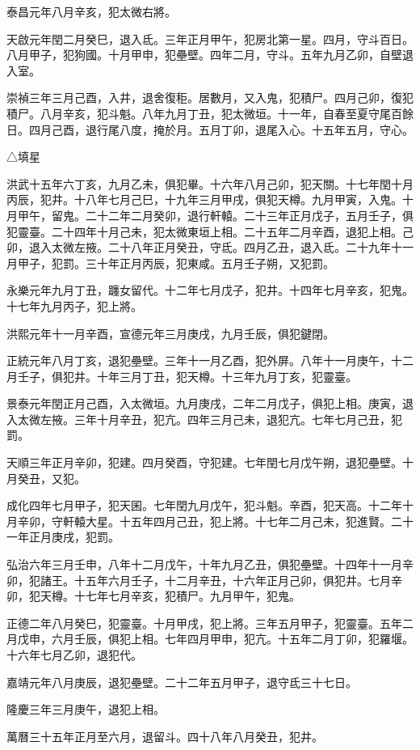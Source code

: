 \begin{pinyinscope}
泰昌元年八月辛亥，犯太微右將。

天啟元年閏二月癸巳，退入氐。三年正月甲午，犯房北第一星。四月，守斗百日。八月甲子，犯狗國。十月甲申，犯壘壁。四年二月，守斗。五年九月乙卯，自壁退入室。

崇禎三年三月己酉，入井，退舍復秬。居數月，又入鬼，犯積尸。四月己卯，復犯積尸。八月辛亥，犯斗魁。八年九月丁丑，犯太微垣。十一年，自春至夏守尾百餘日。四月己酉，退行尾八度，掩於月。五月丁卯，退尾入心。十五年五月，守心。

△填星

洪武十五年六丁亥，九月乙未，俱犯畢。十六年八月己卯，犯天關。十七年閏十月丙辰，犯井。十八年七月己巳，十九年三月甲戌，俱犯天樽。九月甲寅，入鬼。十月甲午，留鬼。二十二年二月癸卯，退行軒轅。二十三年正月戊子，五月壬子，俱犯靈臺。二十四年十月己未，犯太微東垣上相。二十五年二月辛酉，退犯上相。己卯，退入太微左掖。二十八年正月癸丑，守氐。四月乙丑，退入氐。二十九年十一月甲子，犯罰。三十年正月丙辰，犯東咸。五月壬子朔，又犯罰。

永樂元年九月丁丑，躔女留代。十二年七月戊子，犯井。十四年七月辛亥，犯鬼。十七年九月丙子，犯上將。

洪熙元年十一月辛酉，宣德元年三月庚戌，九月壬辰，俱犯鍵閉。

正統元年八月丁亥，退犯壘壁。三年十一月乙酉，犯外屏。八年十一月庚午，十二月壬子，俱犯井。十年三月丁丑，犯天樽。十三年九月丁亥，犯靈臺。

景泰元年閏正月己酉，入太微垣。九月庚戌，二年二月戊子，俱犯上相。庚寅，退入太微左掖。三年十月辛丑，犯亢。四年三月己未，退犯亢。七年七月己丑，犯罰。

天順三年正月辛卯，犯建。四月癸酉，守犯建。七年閏七月戊午朔，退犯壘壁。十月癸丑，又犯。

成化四年七月甲子，犯天囷。七年閏九月戊午，犯斗魁。辛酉，犯天高。十二年十月辛卯，守軒轅大星。十五年四月己丑，犯上將。十七年二月己未，犯進賢。二十一年正月庚戌，犯罰。

弘治六年三月壬申，八年十二月戊午，十年九月乙丑，俱犯壘壁。十四年十一月辛卯，犯諸王。十五年六月壬子，十二月辛丑，十六年正月己卯，俱犯井。七月辛卯，犯天樽。十七年七月辛亥，犯積尸。九月甲午，犯鬼。

正德二年八月癸巳，犯靈臺。十月甲戌，犯上將。三年五月甲子，犯靈臺。五年二月戊申，六月壬辰，俱犯上相。七年四月甲申，犯亢。十五年二月丁卯，犯羅堰。十六年七月乙卯，退犯代。

嘉靖元年八月庚辰，退犯壘壁。二十二年五月甲子，退守氐三十七日。

隆慶三年三月庚午，退犯上相。

萬曆三十五年正月至六月，退留斗。四十八年八月癸丑，犯井。


\end{pinyinscope}
